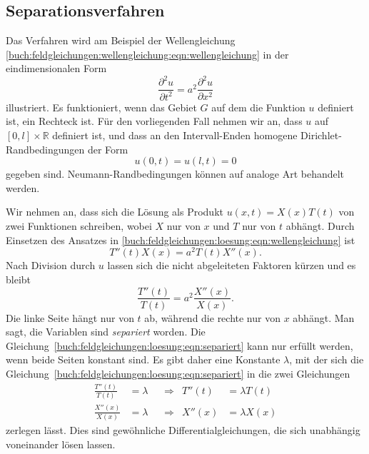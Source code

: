 \subsection{Separationsverfahren}
%
Das Verfahren wird am Beispiel der Wellengleichung
\eqref{buch:feldgleichungen:wellengleichung:eqn:wellengleichung}
in der eindimensionalen Form
\begin{equation}
\frac{\partial^2 u}{\partial t^2}
=
a^2
\frac{\partial^2 u}{\partial x^2}
\label{buch:feldgleichungen:loesung:eqn:wellengleichung}
\end{equation}
illustriert.
Es funktioniert, wenn das Gebiet $G$ auf dem die Funktion $u$
definiert ist, ein Rechteck ist.
Für den vorliegenden Fall nehmen wir an, dass $u$ auf
$[0,l]\times\mathbb{R}$ definiert ist, und dass an den
Intervall-Enden homogene Dirichlet-Randbedingungen der Form 
\[
u(0,t)=u(l,t)=0
\]
gegeben sind.
Neumann-Randbedingungen können auf analoge Art behandelt werden.

Wir nehmen an, dass sich die Lösung als Produkt $u(x,t)=X(x)T(t)$
von zwei Funktionen schreiben, wobei $X$ nur von $x$ und $T$ nur
von $t$ abhängt.
Durch Einsetzen des Ansatzes in
\eqref{buch:feldgleichungen:loesung:eqn:wellengleichung} 
ist
\[
T''(t) X(x)
=
a^2
T(t)
X''(x).
\]
Nach Division durch $u$ lassen sich die nicht abgeleiteten Faktoren
kürzen und es bleibt
\begin{equation}
\frac{T''(t)}{T(t)}
=
a^2
\frac{X''(x)}{X(x)}.
\label{buch:feldgleichungen:loesung:eqn:separiert}
\end{equation}
Die linke Seite hängt nur von $t$ ab, während die rechte nur von $x$
abhängt.
Man sagt, die Variablen sind {\em separiert} worden.
Die Gleichung~\eqref{buch:feldgleichungen:loesung:eqn:separiert}
kann nur erfüllt werden, wenn beide Seiten konstant sind.
Es gibt daher eine Konstante $\lambda$, mit der sich die
Gleichung~\eqref{buch:feldgleichungen:loesung:eqn:separiert}
in die zwei Gleichungen
\[
\begin{aligned}
\frac{T''(t)}{T(t)}&=\lambda &&\Rightarrow& T''(t) &= \lambda T(t) \\
\frac{X''(x)}{X(x)}&=\lambda &&\Rightarrow& X''(x) &= \lambda X(x)
\end{aligned}
\]
zerlegen lässt.
Dies sind gewöhnliche Differentialgleichungen, die sich unabhängig
voneinander lösen lassen.

